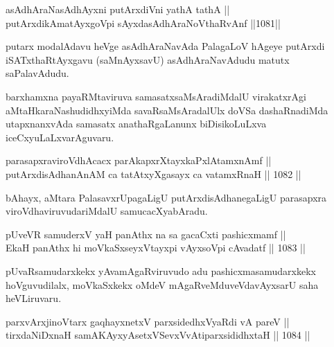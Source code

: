 \begin{shl}
asAdhAraNasAdhAyxni putArxdiVni yathA tathA || \\
putArxdikAmatAyxgoV\s pi sAyxdasAdhAraNoV\s thaRvAnf \hfill ||1081||  
\end{shl}

\begin{artha}
putarx modalAdavu heVge asAdhAraNavAda PalagaLoV hAgeye putArxdi iSATxthaRtAyxgavu (saMnAyxsavU) asAdhAraNavAdudu matutx saPalavAdudu.
\end{artha}

\begin{artha}
barxhamxna payaRMtaviruva samasatxsaMsAradiMdalU virakatxrAgi aMtaHkaraNashudidhxyiMda savaRsaMsAradalUlx doVSa dashaRnadiMda utapxnanxvAda samasatx anathaRgaLanunx biDisikoLuLxva iceCxyuLaLxvarAguvaru.
\end{artha}


\begin{shl}
parasapxraviroVdhAcacx parAkapxrXtayxkaPxlAtamxnAmf || \\
putArxdisAdhanAnAM ca tatAtxyXgasayx ca vatamxRnaH \hfill || 1082 ||  
\end{shl}

\begin{artha}
bAhayx, aMtara PalasavxrUpagaLigU putArxdisAdhanegaLigU parasapxra viroVdhaviruvudariMdalU samucacXyabAradu.
\end{artha}


\begin{shl}
pUveVR samuderxV yaH panAthx na sa gacaCxti pashicxmamf ||  \\
EkaH panAthx hi moVkaSxseyxVtayxpi vAyxsoV\s pi cAvadatf \hfill || 1083 ||  
\end{shl}

\begin{artha}
pUvaRsamudarxkekx yAvamAgaRviruvudo adu pashicxma\break samudarxkekx hoVguvudilalx, moVkaSxkekx oMdeV mAgaRveMdu\break veVdavAyxsarU saha heVLiruvaru.
\end{artha}



\begin{shl}
parxvArxjinoV\s tarx gaqhayxnetxV parxsidedhxVyaRdi vA pareV || \\
tirxdaNiDxnaH samAKAyxyAsetxVSevxVvAtiparxsididhxtaH \hfill || 1084 ||  
\end{shl}


